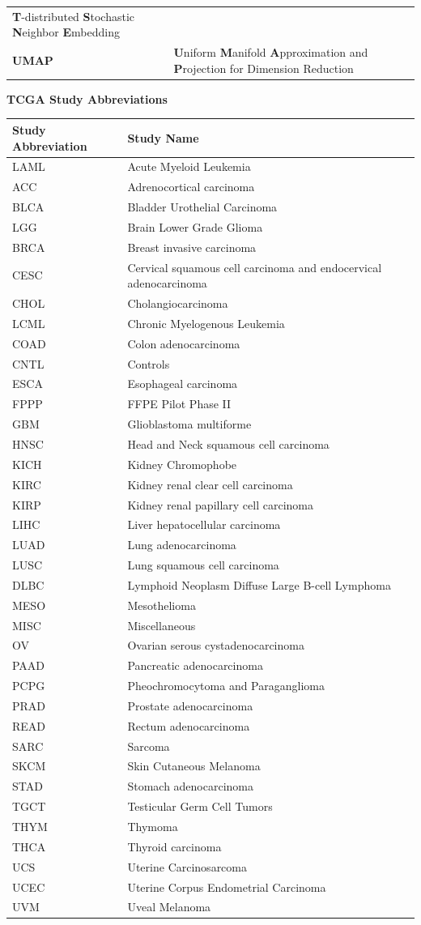 \documentclass[12pt,]{book}
\theoremstyle{definition}
\theoremstyle{definition}
\theoremstyle{definition}
\theoremstyle{remark}
\begin{document}
\begin{longtable}[]{@{}ll@{}}
\begin{minipage}[t]{0.81\columnwidth}
\textbf{T}-distributed \textbf{S}tochastic \textbf{N}eighbor
\textbf{E}mbedding\strut
\end{minipage}\tabularnewline
\begin{minipage}[t]{0.13\columnwidth}\raggedright
\textbf{UMAP}\strut
\end{minipage} & \begin{minipage}[t]{0.81\columnwidth}\raggedright
\textbf{U}niform \textbf{M}anifold \textbf{A}pproximation and
\textbf{P}rojection for Dimension Reduction\strut
\end{minipage}\tabularnewline
\bottomrule
\end{longtable}

\newpage
\thispagestyle{empty}

\vskip 1cm \huge{\textbf{TCGA Study Abbreviations}} \vskip 1cm \small{}

\begin{longtable}[]{@{}ll@{}}
\toprule
Study Abbreviation & Study Name\tabularnewline
\midrule
\endhead
LAML & Acute Myeloid Leukemia\tabularnewline
ACC & Adrenocortical carcinoma\tabularnewline
BLCA & Bladder Urothelial Carcinoma\tabularnewline
LGG & Brain Lower Grade Glioma\tabularnewline
BRCA & Breast invasive carcinoma\tabularnewline
CESC & Cervical squamous cell carcinoma and endocervical
adenocarcinoma\tabularnewline
CHOL & Cholangiocarcinoma\tabularnewline
LCML & Chronic Myelogenous Leukemia\tabularnewline
COAD & Colon adenocarcinoma\tabularnewline
CNTL & Controls\tabularnewline
ESCA & Esophageal carcinoma\tabularnewline
FPPP & FFPE Pilot Phase II\tabularnewline
GBM & Glioblastoma multiforme\tabularnewline
HNSC & Head and Neck squamous cell carcinoma\tabularnewline
KICH & Kidney Chromophobe\tabularnewline
KIRC & Kidney renal clear cell carcinoma\tabularnewline
KIRP & Kidney renal papillary cell carcinoma\tabularnewline
LIHC & Liver hepatocellular carcinoma\tabularnewline
LUAD & Lung adenocarcinoma\tabularnewline
LUSC & Lung squamous cell carcinoma\tabularnewline
DLBC & Lymphoid Neoplasm Diffuse Large B-cell Lymphoma\tabularnewline
MESO & Mesothelioma\tabularnewline
MISC & Miscellaneous\tabularnewline
OV & Ovarian serous cystadenocarcinoma\tabularnewline
PAAD & Pancreatic adenocarcinoma\tabularnewline
PCPG & Pheochromocytoma and Paraganglioma\tabularnewline
PRAD & Prostate adenocarcinoma\tabularnewline
READ & Rectum adenocarcinoma\tabularnewline
SARC & Sarcoma\tabularnewline
SKCM & Skin Cutaneous Melanoma\tabularnewline
STAD & Stomach adenocarcinoma\tabularnewline
TGCT & Testicular Germ Cell Tumors\tabularnewline
THYM & Thymoma\tabularnewline
THCA & Thyroid carcinoma\tabularnewline
UCS & Uterine Carcinosarcoma\tabularnewline
UCEC & Uterine Corpus Endometrial Carcinoma\tabularnewline
UVM & Uveal Melanoma\tabularnewline
\bottomrule
\end{longtable}
\end{document}
